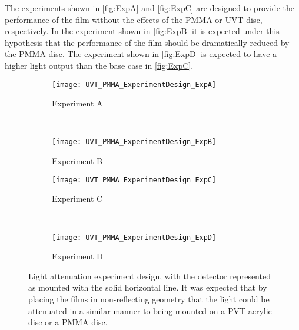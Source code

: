 \documentclass[draftcls,onecolumn]{IEEEtran}
\begin{document}
The experiments shown in \autoref{fig:ExpA} and \autoref{fig:ExpC} are designed to provide the performance of the film without the effects of the PMMA or UVT disc, respectively.
In the experiment shown in \autoref{fig:ExpB} it is expected under this hypothesis that the performance of the film should be dramatically reduced by the PMMA disc.
The experiment shown in \autoref{fig:ExpD} is expected to have a higher light output than the base case in \autoref{fig:ExpC}.
\begin{figure}
  \centering
  \begin{subfigure}[b]{0.45\textwidth}
    \centering
    \texttt{[image: UVT\_PMMA\_ExperimentDesign\_ExpA]}
    \caption{Experiment A}
    \label{fig:ExpA}
  \end{subfigure}%
  ~
  \begin{subfigure}[b]{0.45\textwidth}
    \centering
    \texttt{[image: UVT\_PMMA\_ExperimentDesign\_ExpB]}
    \caption{Experiment B}
    \label{fig:ExpB}
  \end{subfigure}%
  
  \begin{subfigure}[b]{0.45\textwidth}
    \centering
    \texttt{[image: UVT\_PMMA\_ExperimentDesign\_ExpC]}
    \caption{Experiment C}
    \label{fig:ExpC}
  \end{subfigure}%
  ~
  \begin{subfigure}[b]{0.45\textwidth}
    \centering
    \texttt{[image: UVT\_PMMA\_ExperimentDesign\_ExpD]}
    \caption{Experiment D}
    \label{fig:ExpD}
  \end{subfigure}
  \caption[Light Attenuation Experiment Design]{Light attenuation experiment design, with the detector represented as mounted with the solid horizontal line. It was expected that by placing the films in non-reflecting geometry that the light could be attenuated in a similar manner to being mounted on a PVT acrylic disc or a PMMA disc.}
  \label{fig:LightAttenExp}
\end{figure}
\end{document}
